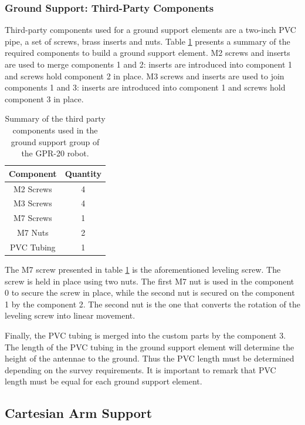 \documentclass{article}
\begin{document}
\subsubsection{Ground Support: Third-Party Components}
Third-party components used for a ground support elements are a two-inch PVC pipe, a set of screws, brass inserts and nuts. Table \ref{tab:ground_third_party} presents a summary of the required components to build a ground support element. M2 screws and inserts are used to merge components 1 and 2: inserts are introduced into component 1 and screws hold component 2 in place. M3 screws and inserts are used to join components 1 and 3: inserts are introduced into component 1 and screws hold component 3 in place. 

\begin{table}[h]
    \centering
    \begin{tabular}{|c|c|}
        \textbf{Component} & \textbf{Quantity} \\ \hline
        M2 Screws & 4 \\
        M3 Screws & 4 \\
        M7 Screws & 1 \\
        M7 Nuts & 2 \\
        PVC Tubing & 1 \\
    \end{tabular}
    \caption{Summary of the third party components used in the ground support group of the GPR-20 robot.}
    \label{tab:ground_third_party}
\end{table}

The M7 screw presented in table \ref{tab:ground_third_party} is the aforementioned leveling screw. The screw is held in place using two nuts. The first M7 nut is used in the component 0 to secure the screw in place, while the second nut is secured on the component 1 by the component 2. The second nut is the one that converts the rotation of the leveling screw into linear movement. 

Finally, the PVC tubing is merged into the custom parts by the component 3. The length of the PVC tubing in the ground support element will determine the height of the antennae to the ground. Thus the PVC length must be determined depending on the survey requirements. It is important to remark that PVC length must be equal for each ground support element.

\subsection{Cartesian Arm Support}
\end{document}
